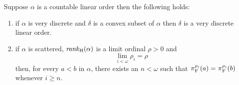 \begin{lem}
	\label{lem:consplit}
	Suppose $\alpha$ is a countable linear order then the following holds:
	\begin{enumerate}
		\item if $\alpha$ is very discrete and $\delta$ is a convex subset of
			$\alpha$ then $\delta$ is a very discrete linear order.
		\item if $\alpha$ is scattered, $\mathit{rank}_\mathrm{H}(\alpha)$ is a limit
			ordinal $\rho>0$ and
			\begin{equation}
				\label{eq:limrank}
				\lim_{i<\omega}\rho_i=\rho
			\end{equation} then,
			for every $a<b$ in $\alpha$, there exists an $n<\omega$ such that
			$\prescript{}{}{\pi}_\mathrm{F}^{\rho_i}(a)=\prescript{}{}{\pi}_\mathrm{F}^{\rho_i}(b)$ whenever $i\geq n$.
	\end{enumerate}
\end{lem}
